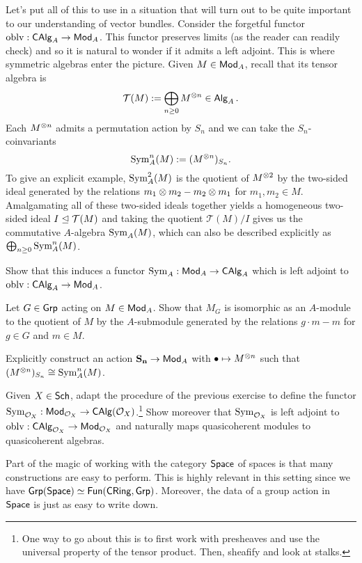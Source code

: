 \documentclass[11pt]{article}
\newcommand{\T}{\mathcal{T}}
\begin{document}
Let's put all of this to use in a situation that will turn out to be quite important to our understanding of vector bundles. Consider the forgetful functor $\operatorname{oblv}: \operatorname{\mathsf{CAlg}}_A\to\operatorname{\mathsf{Mod}}_A$. This functor preserves limits (as the reader can readily check) and so it is natural to wonder if it admits a left adjoint. This is where symmetric algebras enter the picture. Given $M\in\operatorname{\mathsf{Mod}}_A$, recall that its tensor algebra is 
$$\T(M):=\bigoplus_{n\geq0}M^{\tensor n}\in\Alg_A.$$
Each $M^{\otimes n}$ admits a permutation action by $S_n$ and we can take the $S_n$-coinvariants 
$$\operatorname{Sym}_A^n(M):=(M^{\otimes n})_{S_n}.$$
To give an explicit example, $\operatorname{Sym}_A^2(M)$ is the quotient of $M^{\otimes2}$ by the two-sided ideal generated by the relations $m_1\otimes m_2-m_2\otimes m_1$ for $m_1,m_2\in M$. Amalgamating all of these two-sided ideals together yields a homogeneous two-sided ideal $I\normal\T(M)$ and taking the quotient $\T(M)/I$ gives us the commutative $A$-algebra $\operatorname{Sym}_A(M)$, which can also be described explicitly as $\bigoplus_{n\geq0}\operatorname{Sym}_A^n(M)$.

\begin{exercise}
Show that this induces a functor $\operatorname{Sym}_A: \operatorname{\mathsf{Mod}}_A\to\operatorname{\mathsf{CAlg}}_A$ which is left adjoint to $\operatorname{oblv}: \operatorname{\mathsf{CAlg}}_A\to\operatorname{\mathsf{Mod}}_A$.
\end{exercise}

\begin{exercise}
Let $G\in\operatorname{\mathsf{Grp}}$ acting on $M\in\operatorname{\mathsf{Mod}}_A$. Show that $M_G$ is isomorphic as an $A$-module to the quotient of $M$ by the $A$-submodule generated by the relations $g\cdot m-m$ for $g\in G$ and $m\in M$.
\end{exercise}

\begin{exercise}
Explicitly construct an action $\mathbf{S_n}\to\operatorname{\mathsf{Mod}}_A$ with $\bullet\mapsto M^{\otimes n}$ such that $(M^{\otimes n})_{S_n}\cong\operatorname{Sym}_A^n(M)$.
\end{exercise}

\begin{exercise}
Given $X\in\operatorname{\mathsf{Sch}}$, adapt the procedure of the previous exercise to define the functor $\operatorname{Sym}_{\mathcal{O}_X}: \operatorname{\mathsf{Mod}}_{\mathcal{O}_X}\to\operatorname{\mathsf{CAlg}}(\mathcal{O}_X)$.\footnote{One way to go about this is to first work with presheaves and use the universal property of the tensor product. Then, sheafify and look at stalks.} Show moreover that $\operatorname{Sym}_{\mathcal{O}_X}$ is left adjoint to $\operatorname{oblv}: \operatorname{\mathsf{CAlg}}_{\mathcal{O}_X}\to\operatorname{\mathsf{Mod}}_{\mathcal{O}_X}$ and naturally maps quasicoherent modules to quasicoherent algebras.
\end{exercise}

Part of the magic of working with the category $\operatorname{\mathsf{Space}}$ of spaces is that many constructions are easy to perform. This is highly relevant in this setting since we have $\operatorname{\mathsf{Grp}}(\operatorname{\mathsf{Space}})\simeq\operatorname{\mathsf{Fun}}(\operatorname{\mathsf{CRing}},\operatorname{\mathsf{Grp}})$. Moreover, the data of a group action in $\operatorname{\mathsf{Space}}$ is just as easy to write down.
\end{document}
